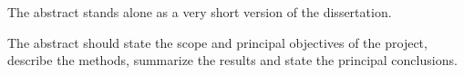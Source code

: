 The abstract stands alone as a very short version of the dissertation.

The abstract should state the scope and principal objectives of the project, describe the methods, summarize the results and state the principal conclusions.
